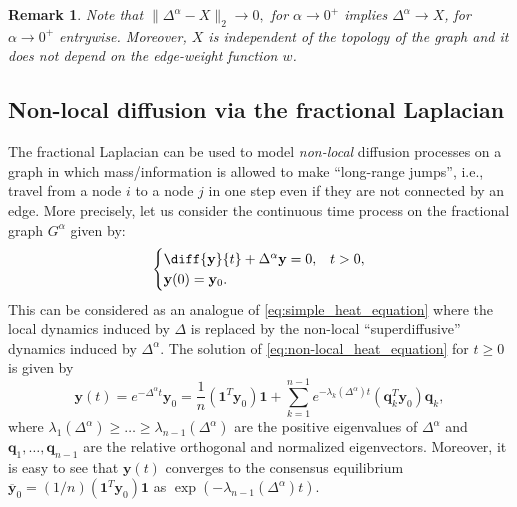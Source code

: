 \documentclass[a4paper,12pt]{article}
\newtheorem{remark}{Remark}
\newcommand{\onevec}{\mathbf{1}}
\newcommand{\yvec}{\mathbf{y}}
\newcommand{\fL}{\Delta^\alpha}
\newcommand{\fG}{G^\alpha}
\begin{document}
 
\begin{remark}
 Note that $\|\Delta^\alpha-X\|_2\rightarrow0,$ for $\alpha\rightarrow0^+$ implies $\fL \rightarrow X$, for $\alpha\rightarrow0^+$ entrywise. Moreover, $X$ is independent of the topology of the graph and it does not depend on the edge-weight function $w$.  
\end{remark}


\subsection{Non-local diffusion via the fractional Laplacian}\label{subsec:model_diffusion}

The fractional Laplacian can be used to model \emph{non-local} diffusion processes on a graph in which mass/information is allowed to make ``long-range jumps'', i.e., travel from a node $i$ to a node $j$ in one step even if they are not connected by an edge. More precisely, let us consider the continuous time process on the fractional graph $\fG$ given by:
\begin{equation}\label{eq:non-local_heat_equation}
\begin{cases}
    \diff{\mathbf{y}}{t} +\fL\mathbf{y}=0, & t>0, \\
    \mathbf{y}(0) = \mathbf{y}_0. 
\end{cases}
\end{equation}
This can be considered as an analogue of \eqref{eq:simple_heat_equation} where the local dynamics induced by $\Delta$ is replaced by the non-local ``superdiffusive'' dynamics induced by $\fL$. The solution of \eqref{eq:non-local_heat_equation} for $t\ge0$ is given by 
\begin{equation*} \label{eq:solution_non-local_heat_equation}
    \mathbf{y}(t) = e^{-\fL t} \mathbf{y}_0 = \frac{1}{n}(\mathbf{1}^T\mathbf{y}_0)\mathbf{1} + \sum_{k=1}^{n-1} e^{-\lambda_k(\fL)t}(\mathbf{q}_k^T\mathbf{y}_0)\mathbf{q}_k,
\end{equation*}
where $\lambda_1(\fL)\geq\dots\geq\lambda_{n-1}(\fL)$ are the positive eigenvalues of $\fL$ and $\mathbf{q}_1,\dots,\mathbf{q}_{n-1}$ are the relative orthogonal and normalized eigenvectors. Moreover, it is easy to see that $\yvec(t)$ converges to the consensus equilibrium $\overline{\yvec}_{0}=(1/n)(\onevec^T\mathbf{y}_0)\onevec$ as $\exp(-\lambda_{n-1}(\fL)t)$.
\end{document}
